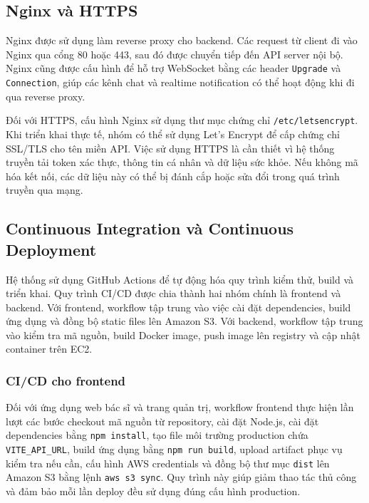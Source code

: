 \subsection{Nginx và HTTPS}
\par Nginx được sử dụng làm reverse proxy cho backend. Các request từ client đi vào Nginx qua cổng 80 hoặc 443, sau đó được chuyển tiếp đến API server nội bộ. Nginx cũng được cấu hình để hỗ trợ WebSocket bằng các header \texttt{Upgrade} và \texttt{Connection}, giúp các kênh chat và realtime notification có thể hoạt động khi đi qua reverse proxy.

\par Đối với HTTPS, cấu hình Nginx sử dụng thư mục chứng chỉ \texttt{/etc/letsencrypt}. Khi triển khai thực tế, nhóm có thể sử dụng Let's Encrypt để cấp chứng chỉ SSL/TLS cho tên miền API. Việc sử dụng HTTPS là cần thiết vì hệ thống truyền tải token xác thực, thông tin cá nhân và dữ liệu sức khỏe. Nếu không mã hóa kết nối, các dữ liệu này có thể bị đánh cắp hoặc sửa đổi trong quá trình truyền qua mạng.

\subsection{Continuous Integration và Continuous Deployment}
\par Hệ thống sử dụng GitHub Actions để tự động hóa quy trình kiểm thử, build và triển khai. Quy trình CI/CD được chia thành hai nhóm chính là frontend và backend. Với frontend, workflow tập trung vào việc cài đặt dependencies, build ứng dụng và đồng bộ static files lên Amazon S3. Với backend, workflow tập trung vào kiểm tra mã nguồn, build Docker image, push image lên registry và cập nhật container trên EC2.

\subsubsection{CI/CD cho frontend}
\par Đối với ứng dụng web bác sĩ và trang quản trị, workflow frontend thực hiện lần lượt các bước checkout mã nguồn từ repository, cài đặt Node.js, cài đặt dependencies bằng \texttt{npm install}, tạo file môi trường production chứa \texttt{VITE\_API\_URL}, build ứng dụng bằng \texttt{npm run build}, upload artifact phục vụ kiểm tra nếu cần, cấu hình AWS credentials và đồng bộ thư mục \texttt{dist} lên Amazon S3 bằng lệnh \texttt{aws s3 sync}. Quy trình này giúp giảm thao tác thủ công và đảm bảo mỗi lần deploy đều sử dụng đúng cấu hình production.

